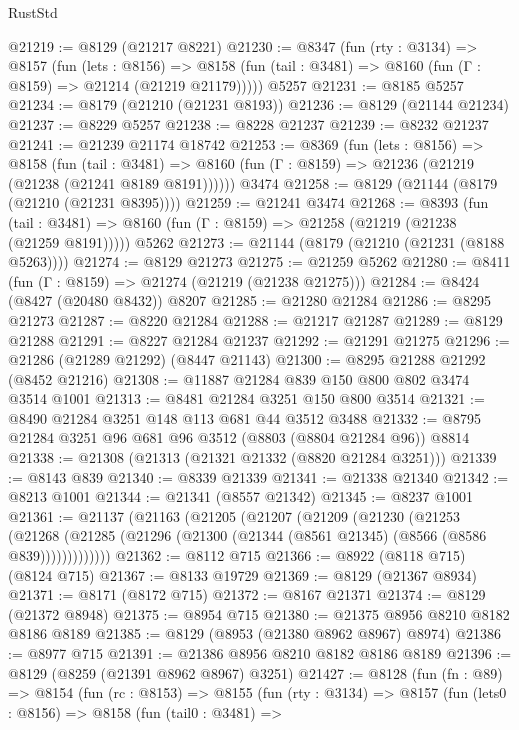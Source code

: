 \begin{lexlean}{RustStd}
\begin{coremodule}
@21219 := @8129 (@21217 @8221)
@21230 := @8347
    (fun (rty : @3134) =>
    @8157
      (fun (lets : @8156) =>
      @8158 (fun (tail : @3481) => @8160 (fun (Γ : @8159) => @21214 (@21219 @21179)))))
    @5257
@21231 := @8185 @5257
@21234 := @8179 (@21210 (@21231 @8193))
@21236 := @8129 (@21144 @21234)
@21237 := @8229 @5257
@21238 := @8228 @21237
@21239 := @8232 @21237
@21241 := @21239 @21174 @18742
@21253 := @8369
    (fun (lets : @8156) =>
    @8158
      (fun (tail : @3481) =>
      @8160 (fun (Γ : @8159) => @21236 (@21219 (@21238 (@21241 @8189 @8191))))))
    @3474
@21258 := @8129 (@21144 (@8179 (@21210 (@21231 @8395))))
@21259 := @21241 @3474
@21268 := @8393
    (fun (tail : @3481) => @8160 (fun (Γ : @8159) => @21258 (@21219 (@21238 (@21259 @8191)))))
    @5262
@21273 := @21144 (@8179 (@21210 (@21231 (@8188 @5263))))
@21274 := @8129 @21273
@21275 := @21259 @5262
@21280 := @8411 (fun (Γ : @8159) => @21274 (@21219 (@21238 @21275)))
@21284 := @8424 (@8427 (@20480 @8432)) @8207
@21285 := @21280 @21284
@21286 := @8295 @21273
@21287 := @8220 @21284
@21288 := @21217 @21287
@21289 := @8129 @21288
@21291 := @8227 @21284 @21237
@21292 := @21291 @21275
@21296 := @21286 (@21289 @21292) (@8447 @21143)
@21300 := @8295 @21288 @21292 (@8452 @21216)
@21308 := @11887 @21284 @839 @150 @800 @802 @3474 @3514 @1001
@21313 := @8481 @21284 @3251 @150 @800 @3514
@21321 := @8490 @21284 @3251 @148 @113 @681 @44 @3512 @3488
@21332 := @8795 @21284 @3251 @96 @681 @96 @3512 (@8803 (@8804 @21284 @96)) @8814
@21338 := @21308 (@21313 (@21321 @21332 (@8820 @21284 @3251)))
@21339 := @8143 @839
@21340 := @8339 @21339
@21341 := @21338 @21340
@21342 := @8213 @1001
@21344 := @21341 (@8557 @21342)
@21345 := @8237 @1001
@21361 := @21137
    (@21163
      (@21205
        (@21207
          (@21209
            (@21230
              (@21253
                (@21268
                  (@21285 (@21296 (@21300 (@21344 (@8561 @21345) (@8566 (@8586 @839)))))))))))))
@21362 := @8112 @715
@21366 := @8922 (@8118 @715) (@8124 @715)
@21367 := @8133 @19729
@21369 := @8129 (@21367 @8934)
@21371 := @8171 (@8172 @715)
@21372 := @8167 @21371
@21374 := @8129 (@21372 @8948)
@21375 := @8954 @715
@21380 := @21375 @8956 @8210 @8182 @8186 @8189
@21385 := @8129 (@8953 (@21380 @8962 @8967) @8974)
@21386 := @8977 @715
@21391 := @21386 @8956 @8210 @8182 @8186 @8189
@21396 := @8129 (@8259 (@21391 @8962 @8967) @3251)
@21427 := @8128
    (fun (fn : @89) =>
    @8154
      (fun (rc : @8153) =>
      @8155
        (fun (rty : @3134) =>
        @8157
          (fun (lets0 : @8156) =>
          @8158
            (fun (tail0 : @3481) =>

\end{coremodule}
\end{lexlean}
